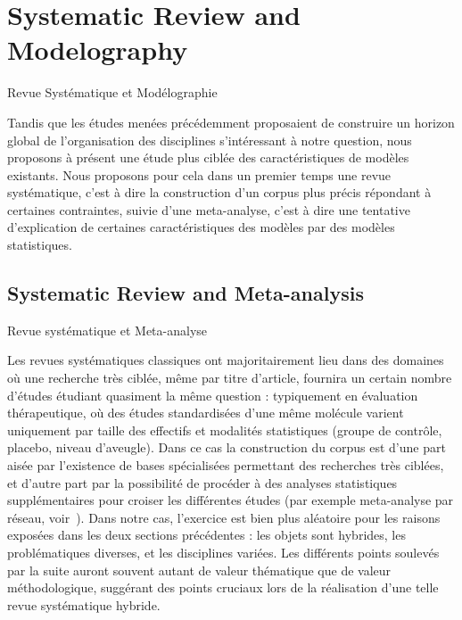 



\newpage

\section{Systematic Review and Modelography}{Revue Systématique et Modélographie}

\label{sec:modelography}



Tandis que les études menées précédemment proposaient de construire un horizon global de l'organisation des disciplines s'intéressant à notre question, nous proposons à présent une étude plus ciblée des caractéristiques de modèles existants. Nous proposons pour cela dans un premier temps une revue systématique, c'est à dire la construction d'un corpus plus précis répondant à certaines contraintes, suivie d'une meta-analyse, c'est à dire une tentative d'explication de certaines caractéristiques des modèles par des modèles statistiques.


\subsection[Systematic Review][Revue Systématique]{Systematic Review and Meta-analysis}{Revue systématique et Meta-analyse}



Les revues systématiques classiques ont majoritairement lieu dans des domaines où une recherche très ciblée, même par titre d'article, fournira un certain nombre d'études étudiant quasiment la même question : typiquement en évaluation thérapeutique, où des études standardisées d'une même molécule varient uniquement par taille des effectifs et modalités statistiques (groupe de contrôle, placebo, niveau d'aveugle). Dans ce cas la construction du corpus est d'une part aisée par l'existence de bases spécialisées permettant des recherches très ciblées, et d'autre part par la possibilité de procéder à des analyses statistiques supplémentaires pour croiser les différentes études (par exemple meta-analyse par réseau, voir~\cite{rucker2012network}). Dans notre cas, l'exercice est bien plus aléatoire pour les raisons exposées dans les deux sections précédentes : les objets sont hybrides, les problématiques diverses, et les disciplines variées. Les différents points soulevés par la suite auront souvent autant de valeur thématique que de valeur méthodologique, suggérant des points cruciaux lors de la réalisation d'une telle revue systématique hybride.


